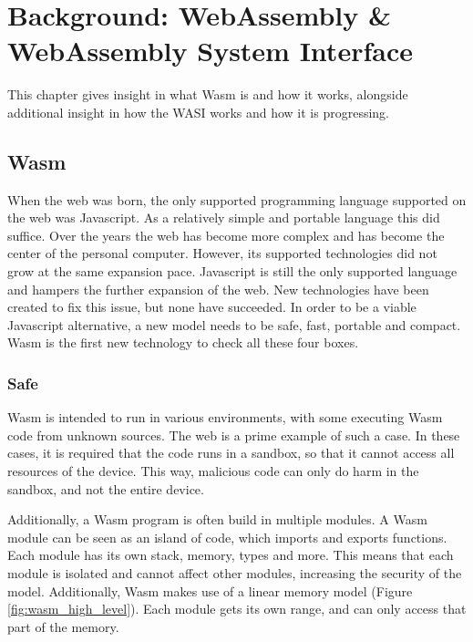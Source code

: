 \chapter{Background: WebAssembly {\&} WebAssembly System Interface}
This chapter gives insight in what \acrfull{Wasm} is and how it works, alongside additional insight in how the \acrfull{WASI} works and how it is progressing.

\section{\acrshort{Wasm}}

When the web was born, the only supported programming language supported on the web was Javascript. As a relatively simple and portable language this did suffice. Over the years the web has become more complex and has become the center of the personal computer. However, its supported technologies did not grow at the same expansion pace. Javascript is still the only supported language and hampers the further expansion of the web. New technologies have been created to fix this issue, but none have succeeded. 
In order to be a viable Javascript alternative, a new model needs to be safe, fast, portable and compact. \acrshort{Wasm} is the first new technology to check all these four boxes. \cite{bringing_the_web_up_to_speed}

\subsection{Safe}
Wasm is intended to run in various environments, with some executing Wasm code from unknown sources. The web is a prime example of such a case. In these cases, it is required that the code runs in a sandbox, so that it cannot access all resources of the device. This way, malicious code can only do harm in the sandbox, and not the entire device.

Additionally, a Wasm program is often build in multiple modules. A Wasm module can be seen as an island of code, which imports and exports functions. Each module has its own stack, memory, types and more. This means that each module is isolated and cannot affect other modules, increasing the security of the model. Additionally, Wasm makes use of a linear memory model (Figure \ref{fig:wasm_high_level}). Each module gets its own range, and can only access that part of the memory.

